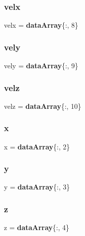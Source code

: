 \mbox{\label{_import_log_8m_ac2ec2a4c54892db0cc62ff85bdd02098}} 
\subsubsection{velx}
{\footnotesize\ttfamily velx = \textbf{ data\+Array}\{\+:, 8\}}

\mbox{\label{_import_log_8m_a88392913e56ddcefdc658bcf903e97f3}} 
\subsubsection{vely}
{\footnotesize\ttfamily vely = \textbf{ data\+Array}\{\+:, 9\}}

\mbox{\label{_import_log_8m_ad21037293c95293c4b19e5b7010d25b4}} 
\subsubsection{velz}
{\footnotesize\ttfamily velz = \textbf{ data\+Array}\{\+:, 10\}}

\mbox{\label{_import_log_8m_a9336ebf25087d91c818ee6e9ec29f8c1}} 
\subsubsection{x}
{\footnotesize\ttfamily x = \textbf{ data\+Array}\{\+:, 2\}}

\mbox{\label{_import_log_8m_a2fb1c5cf58867b5bbc9a1b145a86f3a0}} 
\subsubsection{y}
{\footnotesize\ttfamily y = \textbf{ data\+Array}\{\+:, 3\}}

\mbox{\label{_import_log_8m_a25ed1bcb423b0b7200f485fc5ff71c8e}} 
\subsubsection{z}
{\footnotesize\ttfamily z = \textbf{ data\+Array}\{\+:, 4\}}

